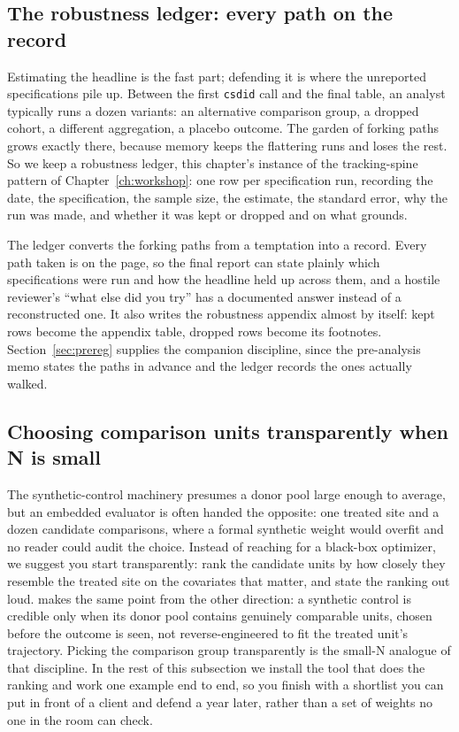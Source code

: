 \subsection{The robustness ledger: every path on the record}\label{ch08-sc-ledger}
Estimating the headline is the fast part; defending it is where the unreported specifications pile up. Between the first \texttt{csdid} call and the final table, an analyst typically runs a dozen variants: an alternative comparison group, a dropped cohort, a different aggregation, a placebo outcome. The garden of forking paths grows exactly there, because memory keeps the flattering runs and loses the rest. So we keep a robustness ledger, this chapter's instance of the tracking-spine pattern of Chapter~\ref{ch:workshop}: one row per specification run, recording the date, the specification, the sample size, the estimate, the standard error, why the run was made, and whether it was kept or dropped and on what grounds.

The ledger converts the forking paths from a temptation into a record. Every path taken is on the page, so the final report can state plainly which specifications were run and how the headline held up across them, and a hostile reviewer's \enquote{what else did you try} has a documented answer instead of a reconstructed one. It also writes the robustness appendix almost by itself: kept rows become the appendix table, dropped rows become its footnotes. Section~\ref{sec:prereg} supplies the companion discipline, since the pre-analysis memo states the paths in advance and the ledger records the ones actually walked.

\subsection{Choosing comparison units transparently when N is small}\label{ch08-sec:twins}
The synthetic-control machinery presumes a donor pool large enough to average, but an embedded evaluator is often handed the opposite: one treated site and a dozen candidate comparisons, where a formal synthetic weight would overfit and no reader could audit the choice. Instead of reaching for a black-box optimizer, we suggest you start transparently: rank the candidate units by how closely they resemble the treated site on the covariates that matter, and state the ranking out loud. \textcite{abadie2021synth} makes the same point from the other direction: a synthetic control is credible only when its donor pool contains genuinely comparable units, chosen before the outcome is seen, not reverse-engineered to fit the treated unit's trajectory. Picking the comparison group transparently is the small-N analogue of that discipline. In the rest of this subsection we install the tool that does the ranking and work one example end to end, so you finish with a shortlist you can put in front of a client and defend a year later, rather than a set of weights no one in the room can check.

